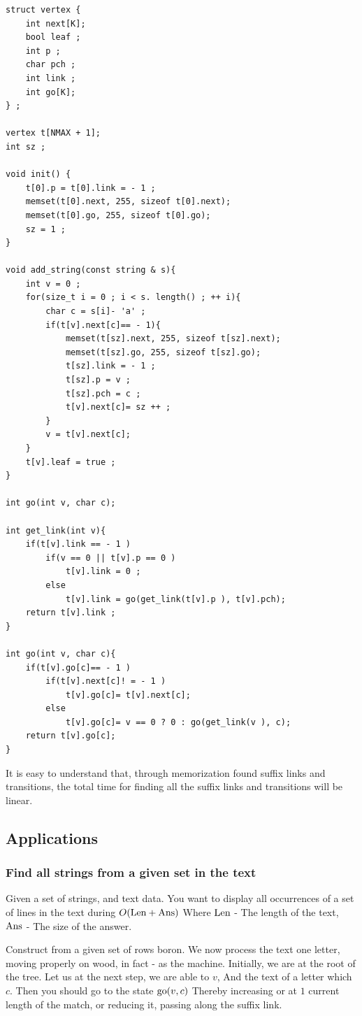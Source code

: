 \begin{verbatim}
struct vertex {
    int next[K];
    bool leaf ;
    int p ;
    char pch ;
    int link ;
    int go[K];
} ;
 
vertex t[NMAX + 1];
int sz ;
 
void init() {
    t[0].p = t[0].link = - 1 ;
    memset(t[0].next, 255, sizeof t[0].next);
    memset(t[0].go, 255, sizeof t[0].go);
    sz = 1 ;
}
 
void add_string(const string & s){
    int v = 0 ;
    for(size_t i = 0 ; i < s. length() ; ++ i){
        char c = s[i]- 'a' ;
        if(t[v].next[c]== - 1){
            memset(t[sz].next, 255, sizeof t[sz].next);
            memset(t[sz].go, 255, sizeof t[sz].go);
            t[sz].link = - 1 ;
            t[sz].p = v ;
            t[sz].pch = c ;
            t[v].next[c]= sz ++ ;
        }
        v = t[v].next[c];
    }
    t[v].leaf = true ;
}
 
int go(int v, char c);
 
int get_link(int v){
    if(t[v].link == - 1 )
        if(v == 0 || t[v].p == 0 )
            t[v].link = 0 ;
        else
            t[v].link = go(get_link(t[v].p ), t[v].pch);
    return t[v].link ;
}
 
int go(int v, char c){
    if(t[v].go[c]== - 1 )
        if(t[v].next[c]! = - 1 )
            t[v].go[c]= t[v].next[c];
        else
            t[v].go[c]= v == 0 ? 0 : go(get_link(v ), c);
    return t[v].go[c];
} 
\end{verbatim}
It is easy to understand that, through memorization found suffix links and transitions, the total time for finding all the suffix links and transitions will be linear.

\subsection{ Applications }

\subsubsection{ Find all strings from a given set in the text }

Given a set of strings, and text data. You want to display all occurrences of a set of lines in the text during $O ({\rm Len + Ans})$ Where $\rm Len$ - The length of the text, $\rm Ans$ - The size of the answer.

Construct from a given set of rows boron. We now process the text one letter, moving properly on wood, in fact - as the machine. Initially, we are at the root of the tree. Let us at the next step, we are able to $v$, And the text of a letter which $c$. Then you should go to the state ${\rm go} (v, c)$ Thereby increasing or at $1$ current length of the match, or reducing it, passing along the suffix link.


